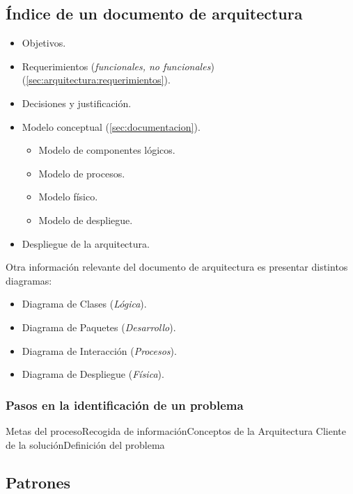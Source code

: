 \subsection{Índice de un documento de arquitectura}
\label{sec:indicearquitectura}
\begin{itemize}[noitemsep]
\item Objetivos.
\item Requerimientos (\emph{funcionales, no funcionales})
  (\ref{sec:arquitectura:requerimientos}).
\item Decisiones y justificación.
\item Modelo conceptual (\ref{sec:documentacion}).
  \begin{itemize}[noitemsep]
  \item Modelo de componentes lógicos.
  \item Modelo de procesos.
  \item Modelo físico.
  \item Modelo de despliegue.
  \end{itemize}
\item Despliegue de la arquitectura.
\end{itemize}

Otra información relevante del documento de arquitectura es presentar
distintos diagramas:
\begin{itemize}[noitemsep]
\item Diagrama de Clases (\emph{Lógica}).
\item Diagrama de Paquetes (\emph{Desarrollo}).
\item Diagrama de Interacción (\emph{Procesos}).
\item Diagrama de Despliegue (\emph{Física}).
\end{itemize}

\subsubsection{Pasos en la identificación de un problema}
Metas del proceso\textrightarrow Recogida de
información\textrightarrow Conceptos de la Arquitectura\textrightarrow
Cliente de la solución\textrightarrow Definición del problema

\subsection{Patrones}
\label{sec:patrones}

